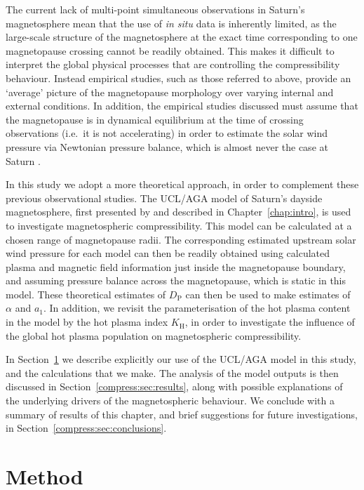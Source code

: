 The current lack of multi-point simultaneous observations in Saturn's magnetosphere mean that the use of \textit{in situ} data is inherently limited, as the large-scale structure of the magnetosphere at the exact time corresponding to one magnetopause crossing cannot be readily obtained. This makes it difficult to interpret the global physical processes that are controlling the compressibility behaviour. Instead empirical studies, such as those referred to above, provide an `average' picture of the magnetopause morphology over varying internal and external conditions. In addition, the empirical studies discussed must assume that the magnetopause is in dynamical equilibrium at the time of crossing observations (i.e.\ it is not accelerating) in order to estimate the solar wind pressure via Newtonian pressure balance, which is almost never the case at Saturn \cite[e.g.][]{dougherty2005,masters2011,pilkington2015}.

In this study we adopt a more theoretical approach, in order to complement these previous observational studies. The UCL/AGA model of Saturn's dayside magnetosphere, first presented by \citet{achilleos2010a} and described in Chapter~\ref{chap:intro}, is used to investigate magnetospheric compressibility. This model can be calculated at a chosen range of magnetopause radii. The corresponding estimated upstream solar wind pressure for each model can then be readily obtained using calculated plasma and magnetic field information just inside the magnetopause boundary, and assuming pressure balance across the magnetopause, which is static in this model. These theoretical estimates of $D_\mathrm{P}$ can then be used to make estimates of $\alpha$ and $a_1$. In addition, we revisit the parameterisation of the hot plasma content in the model by the hot plasma index $K_\mathrm{H}$, in order to investigate the influence of the global hot plasma population on magnetospheric compressibility.

In Section~\ref{compress:sec:method} we describe explicitly our use of the UCL/AGA model in this study, and the calculations that we make. The analysis of the model outputs is then discussed in Section~\ref{compress:sec:results}, along with possible explanations of the underlying drivers of the magnetospheric behaviour. We conclude with a summary of results of this chapter, and brief suggestions for future investigations, in Section~\ref{compress:sec:conclusions}.

\section{Method}\label{compress:sec:method}
